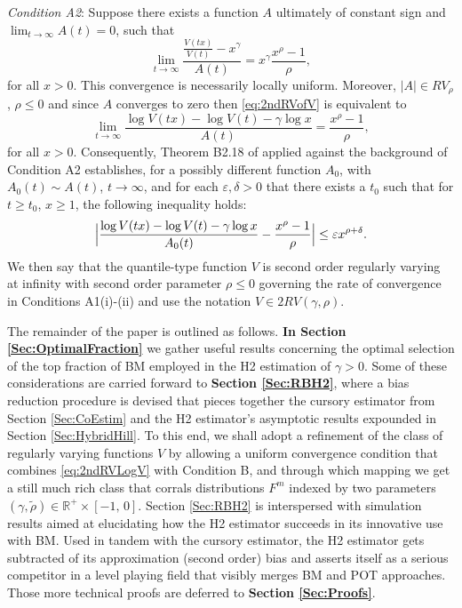 \documentclass[11pt, a4paper, oneside]{article}
\numberwithin{equation}{section}
\theoremstyle{plain}
\theoremstyle{definition}
\newcommand{\field}[1]{\mathbb{#1}}
\newcommand{\real}{\ensuremath{{\field{R}}}}
\newcommand{\limit}[1]{\ensuremath{\displaystyle {\lim_{#1 \rightarrow{\infty}}}}}
\begin{document}
\emph{Condition A2}: Suppose there exists a function $A$ ultimately of constant sign and $\lim_{t\to \infty}A(t)=0$, such that
\begin{equation}\label{eq:2ndRVofV}
     \limit{t}\frac{\frac{V(tx)}{V(t)}-x^{\gamma}}{A(t)}=x^{{\gamma}}\frac{x^{\rho}-1}{\rho},
    \end{equation}
for all $x>0$. This convergence is necessarily locally uniform. Moreover, $|A| \in RV_{\rho}$, $\rho \leq 0$ and since $A$ converges to zero then \eqref{eq:2ndRVofV} is equivalent to 
\begin{equation}\label{eq:2ndRVLogV}
    \limit{t}\frac{\log V(tx)-\log V(t)-\gamma \log x}{A(t)}=\frac{x^{\rho}-1}{\rho},
\end{equation}
for all $x>0$.
Consequently, Theorem B2.18 of \citet{deHaanFerreira2006} applied against the background of Condition A2 establishes, for a possibly different function $A_{0}$, with $A_{0}(t)\sim A(t)$, $t\rightarrow\infty$, and for each $\varepsilon,\delta>0$ that there exists a $t_0$ such that for $t\geq t_0$, $x\geq 1$, the following inequality holds:
\begin{equation}\label{inequality}
    \Bigl|\frac{\log V(tx)-\log V(t)-\gamma \log x}{A_0(t)}-\frac{x^{\rho}-1}{\rho}\Bigr|\leq\varepsilon x^{\rho+\delta}.
\end{equation}
We then say that the quantile-type function $V$ is second order regularly varying at infinity with second order parameter $\rho \leq 0$ governing the rate of convergence in Conditions A1(i)-(ii) and use the notation $V \in 2RV(\gamma, \rho)$.



The remainder of the paper is outlined as follows. \textbf{In Section \ref{Sec:OptimalFraction}} we gather useful results concerning the optimal selection of the top fraction of BM employed in the H2 estimation of $\gamma>0$.  Some of these considerations are carried forward to \textbf{Section \ref{Sec:RBH2}}, where a bias reduction procedure is devised that pieces together the cursory estimator from Section \ref{Sec:CoEstim} and the H2 estimator's asymptotic results expounded in Section \ref{Sec:HybridHill}. To this end, we shall adopt a refinement of the class of regularly varying functions $V$ by allowing a uniform convergence condition that combines \eqref{eq:2ndRVLogV} with Condition B, and through which mapping we get a still much rich class that corrals distributions $F^m$ indexed by two parameters $(\gamma, \tilde{\rho}) \in \real^+ \times [-1, \, 0]$.
Section \ref{Sec:RBH2} is interspersed with simulation results aimed at elucidating how the H2 estimator succeeds in its innovative use with BM. Used in tandem with the cursory estimator, the H2 estimator gets subtracted of its approximation (second order) bias and asserts itself as a serious competitor in a level playing field that visibly merges BM and POT approaches. 
Those more technical proofs are deferred to \textbf{Section \ref{Sec:Proofs}}.
\end{document}
